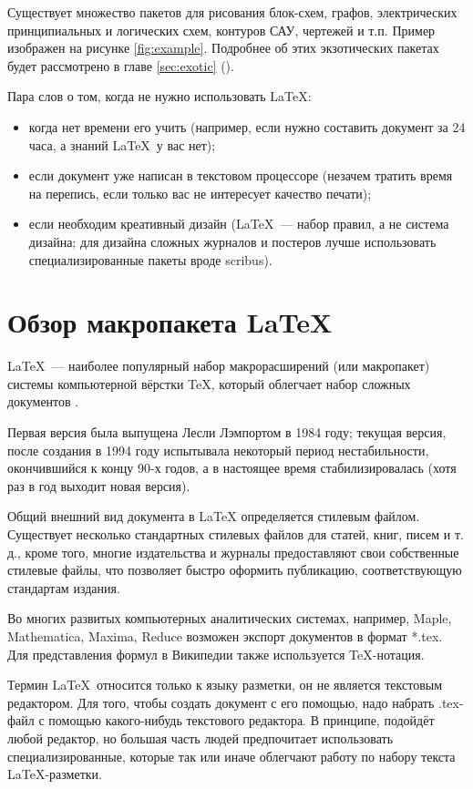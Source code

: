 Существует множество пакетов для рисования блок-схем, графов, электрических принципиальных и логических схем, контуров САУ, чертежей и т.п. Пример изображен на рисунке \ref{fig:example}. Подробнее об этих экзотических пакетах будет рассмотрено в главе \ref{sec:exotic} ().

Пара слов о том, когда не нужно использовать \LaTeX:

\begin{itemize}
    \item когда нет времени его учить (например, если нужно составить документ за 24 часа, а знаний \LaTeX~у вас нет);
    \item если документ уже написан в текстовом процессоре (незачем тратить время на перепись, если только вас не интересует качество печати);
    \item если необходим креативный дизайн (\LaTeX~--- набор правил, а не система дизайна; для дизайна сложных журналов и постеров лучше использовать специализированные пакеты вроде scribus).
\end{itemize}

\section{Обзор макропакета \LaTeX}

\LaTeX~--- наиболее популярный набор макрорасширений (или макропакет) системы компьютерной вёрстки \TeX, который облегчает набор сложных документов \cite{wiki:latex}.

Первая версия была выпущена Лесли Лэмпортом в 1984 году; текущая версия, после создания в 1994 году испытывала некоторый период нестабильности, окончившийся к концу 90-х годов, а в настоящее время стабилизировалась (хотя раз в год выходит новая версия).

Общий внешний вид документа в LaTeX определяется стилевым файлом. Существует несколько стандартных стилевых файлов для статей, книг, писем и т. д., кроме того, многие издательства и журналы предоставляют свои собственные стилевые файлы, что позволяет быстро оформить публикацию, соответствующую стандартам издания.

Во многих развитых компьютерных аналитических системах, например, Maple, Mathematica, Maxima, Reduce возможен экспорт документов в формат *.tex. Для представления формул в Википедии также используется \TeX-нотация.

Термин \LaTeX~относится только к языку разметки, он не является текстовым редактором. Для того, чтобы создать документ с его помощью, надо набрать .tex-файл с помощью какого-нибудь текстового редактора. В принципе, подойдёт любой редактор, но большая часть людей предпочитает использовать специализированные, которые так или иначе облегчают работу по набору текста \LaTeX-разметки.

